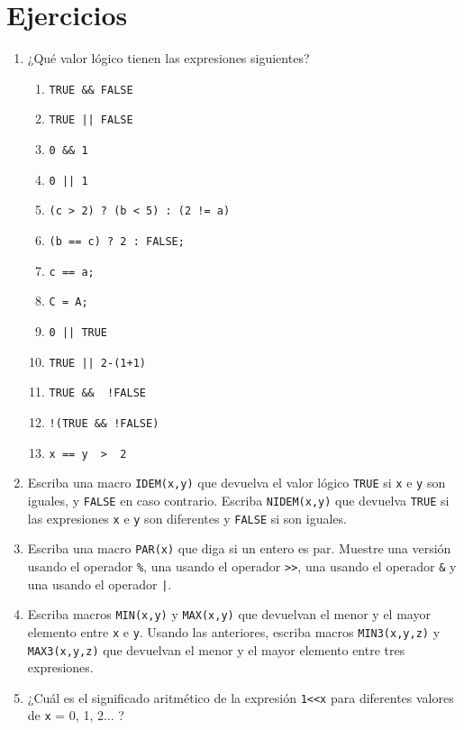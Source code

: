 \section{Ejercicios}
\begin{enumerate}
\item ¿Qué valor lógico tienen las expresiones siguientes?
\begin{enumerate}[label=\alph*.]
	\item \lstinline{TRUE && FALSE}
	\item \lstinline{TRUE || FALSE}
	\item \lstinline{0 && 1}
	\item \lstinline{0 || 1}
	\item \lstinline{(c > 2) ? (b < 5) : (2 != a)}
	\item \lstinline{(b == c) ? 2 : FALSE;}
	\item \lstinline{c == a;}
	\item \lstinline{C = A;}
	\item \lstinline{0 || TRUE}
	\item \lstinline{TRUE || 2-(1+1)}
	\item \lstinline{TRUE &&  !FALSE}
	\item \lstinline{!(TRUE && !FALSE)}
	\item \lstinline{x == y  >  2}
\end{enumerate}
\item Escriba una macro \lstinline{IDEM(x,y)} que devuelva el valor lógico \lstinline{TRUE} si \lstinline{x} e \lstinline{y} son iguales, y \lstinline{FALSE} en caso contrario. Escriba \lstinline{NIDEM(x,y)} que devuelva \lstinline{TRUE} si las expresiones \lstinline{x} e \lstinline{y} son diferentes y \lstinline{FALSE} si son iguales.

\item Escriba una macro \lstinline{PAR(x)} que diga si un entero es par. Muestre una versión usando el operador \lstinline{%}, una usando el operador \lstinline{>>}, una usando el operador \lstinline{&} y una usando el operador \lstinline{|}.

\item  Escriba macros \lstinline{MIN(x,y)} y \lstinline{MAX(x,y)} que devuelvan el menor y el mayor elemento entre \lstinline{x} e \lstinline{y}. Usando las anteriores, escriba macros \lstinline{MIN3(x,y,z)} y \lstinline{MAX3(x,y,z)} que devuelvan el menor y el mayor elemento entre tres expresiones.

\item ¿Cuál es el significado aritmético de la expresión \lstinline{1<<x} para diferentes valores de \lstinline{x} = 0, 1, 2... ?


\end{enumerate}
